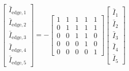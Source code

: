 \documentclass[
]{book}
\begin{document}
\[ \begin{aligned}
    \left[\begin{array}{l}
    \bar{I}_{\text{edge}, 1} \\
    \bar{I}_{\text{edge}, 2} \\
    \bar{I}_{\text{edge}, 3} \\
    \bar{I}_{\text{edge}, 4} \\
    \bar{I}_{\text{edge}, 5}
    \end{array}\right]
    = - \left[\begin{array}{lllll}
    1 & 1 & 1 & 1 & 1 \\
    0 & 1 & 1 & 1 & 1 \\
    0 & 0 & 1 & 1 & 0 \\
    0 & 0 & 0 & 1 & 0 \\
    0 & 0 & 0 & 0 & 1
    \end{array}\right]
    \left[\begin{array}{l}
    \bar{I}_{1} \\
    \bar{I}_{2} \\
    \bar{I}_{3} \\
    \bar{I}_{4} \\
    \bar{I}_{5}
    \end{array}\right]
\end{aligned} \]
\end{document}
